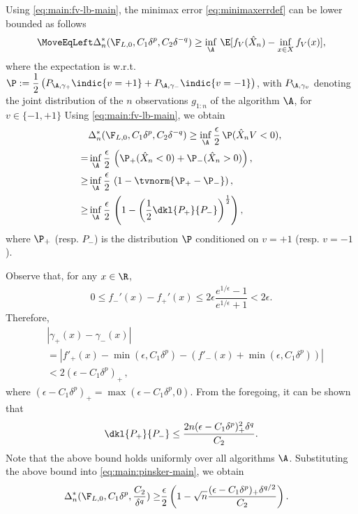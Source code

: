 Using \eqref{eq:main:fv-lb-main}, the minimax error \eqref{eq:minimaxerrdef} can be lower bounded as follows
\begin{align*}
\MoveEqLeft 
\Delta_n^*(\F_{L,0}, C_1 \delta^p ,C_2 \delta^{-q}) %
  \ge  \inf_{\A} \,  \E[f_V(\hat X_n) - \inf_{x \in X}
  f_V(x)],
  \end{align*}
where the expectation is w.r.t. $\P:= \dfrac{1}{2} \left(P_{\A, \gamma_+} \indic{v=+1} + P_{\A, \gamma_-}\indic{v=-1}\right)$, with $P_{\A,\gamma_v}$ denoting the joint distribution of the $n$ observations $g_{1:n}$ of the algorithm $\A$, for $v \in \{-1,+1\}$
Using \eqref{eq:main:fv-lb-main}, we obtain
\begin{align}
&\Delta_n^*(\F_{L,0}, C_1 \delta^p ,C_2 \delta^{-q})  \ge  \inf_{\A} \dfrac{\epsilon}{2}\,  \P(\hat X_n V < 0), \label{eq:main:strong-convex-bd}\\
  = & \inf_{\A} \dfrac{\epsilon }{2} \, \left(\P_{+}(\hat X_n < 0) + \P_{-}(\hat X_n > 0)\right), \label{eq:main:Pplus}\\
  \ge &\inf_{\A} \dfrac{\epsilon }{2} \,\left(1 - \tvnorm{\P_{+}- \P_{-}}\right), \label{eq:main:lecam}\\
  \ge &\inf_{\A} \dfrac{\epsilon }{2}  \,\left( 1 - \left(\frac12\dkl{P_{+}}{P_{-}}\right)^{\frac{1}{2}}\right), \label{eq:main:pinsker-main}
\end{align}
where $\P_{+}$ (resp. $P_-$) is the distribution $\P$ conditioned on $v=+1$ (resp. $v=-1$).

Observe that, for any $x\in \R$, 
\begin{align*}
0 \le f_-'(x) - f_+'(x) \le 2\epsilon \dfrac{e^{1/\epsilon}-1}{e^{1/\epsilon}+1} < 2\epsilon .
\end{align*}
Therefore,
\begin{align}
& |\gamma_+(x) - \gamma_-(x)| \nonumber\\
& = | f'_+(x) - \min(\epsilon,C_1 \delta^p) - (f'_-(x)+\min(\epsilon,C_1 \delta^p)) | \nonumber \\
& < 2 (\epsilon - C_1 \delta^p)_+\,,
 \label{eq:main:gdiff-ub}
\end{align}
where $(\epsilon - C_1 \delta^p)_+ = \max(\epsilon - C_1 \delta^p,0)$. 
From the foregoing, it can be shown that 
\begin{align}
\dkl{P_{+}}{P_{-}} \le \dfrac{2n(\epsilon-C_1\delta^p)_+^2 \delta^q}{C_2}.\label{eq:main:dkbd-main}
\end{align}
Note that the above bound holds uniformly over all algorithms $\A$. 
Substituting the above bound into \eqref{eq:main:pinsker-main}, we obtain 
\begin{align*}
 \Delta_n^*(\F_{L,0}, C_1 \delta^p ,\frac{C_2}{\delta^{q}})
  \ge & \frac{\epsilon}{2} \left(1 - \sqrt{
    n}  \frac{(\epsilon-C_1\delta^p)_+\delta^{q/2}}{C_2}
  \right).\label{eq:main:final-lower-bd}
\end{align*}

